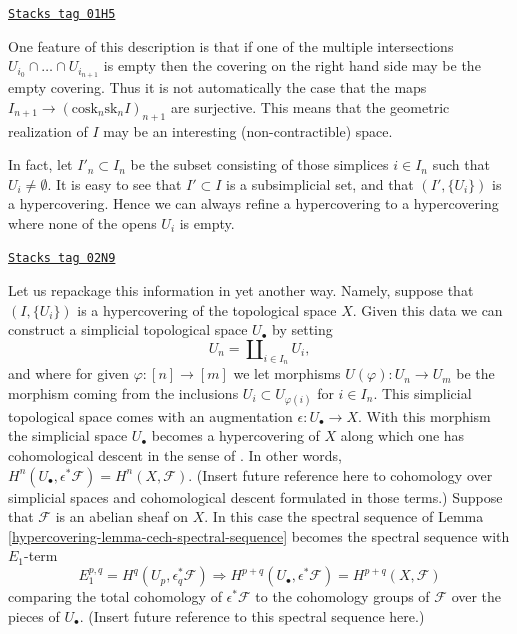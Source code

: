 \begin{remark}
\label{hypercovering-remark-not-covering-set}
\href{https://stacks.math.columbia.edu/tag/01H5}{\texttt{Stacks tag 01H5}}

One feature of this description is that if one of the multiple
intersections $U_{i_0} \cap \ldots \cap U_{i_{n + 1}}$ is empty then
the covering on the right hand side may be the empty covering.
Thus it is not automatically the case that the maps
$I_{n + 1} \to (\text{cosk}_n\text{sk}_n I)_{n + 1}$ are surjective.
This means that the geometric realization of $I$ may be an interesting
(non-contractible) space.

\medskip\noindent
In fact, let $I'_n \subset I_n$ be the subset
consisting of those simplices $i \in I_n$ such that
$U_i \not = \emptyset$. It is easy to see that $I' \subset I$
is a subsimplicial set, and that $(I', \{U_i\})$ is a hypercovering.
Hence we can always refine a hypercovering to a hypercovering where
none of the opens $U_i$ is empty.
\end{remark}

\begin{remark}
\label{hypercovering-remark-repackage-into-simplicial-space}
\href{https://stacks.math.columbia.edu/tag/02N9}{\texttt{Stacks tag 02N9}}

Let us repackage this information in yet another way.
Namely, suppose that $(I, \{U_i\})$ is a hypercovering of
the topological space $X$. Given this data we can construct
a simplicial topological space $U_\bullet$ by setting
$$
U_n = \coprod\nolimits_{i \in I_n} U_i,
$$
and where for given $\varphi : [n] \to [m]$ we let
morphisms $U(\varphi) : U_n \to U_m$ be the morphism
coming from the inclusions $U_i \subset U_{\varphi(i)}$
for $i \in I_n$. This simplicial topological space comes
with an augmentation $\epsilon : U_\bullet \to X$.
With this morphism the simplicial space $U_\bullet$ becomes
a hypercovering of $X$ along which one has cohomological descent
in the sense of \cite[Expos\'e Vbis]{SGA4}.
In other words, $H^n(U_\bullet, \epsilon^*\mathcal{F}) = H^n(X, \mathcal{F})$.
(Insert future reference here to cohomology over simplicial
spaces and cohomological descent formulated in those terms.)
Suppose that $\mathcal{F}$ is an abelian sheaf on $X$.
In this case the spectral sequence of Lemma \ref{hypercovering-lemma-cech-spectral-sequence}
becomes the spectral sequence with $E_1$-term
$$
E_1^{p, q} = H^q(U_p, \epsilon_q^*\mathcal{F})
\Rightarrow
H^{p + q}(U_\bullet, \epsilon^*\mathcal{F}) = H^{p + q}(X, \mathcal{F})
$$
comparing the total cohomology of $\epsilon^*\mathcal{F}$
to the cohomology groups of $\mathcal{F}$ over the pieces
of $U_\bullet$. (Insert future reference to this spectral sequence
here.)
\end{remark}

